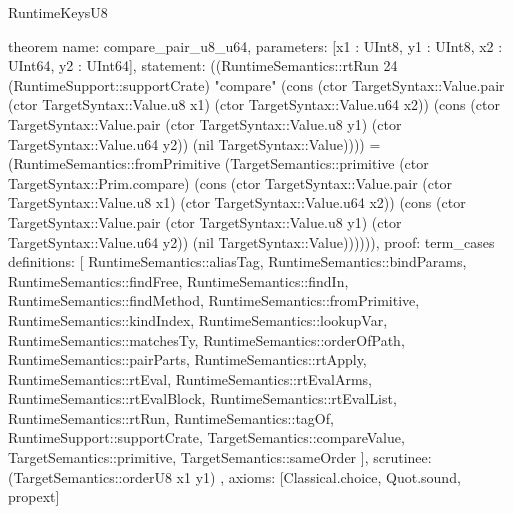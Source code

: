 \begin{lexlean}{RuntimeKeysU8}
\begin{semanticmodule}
theorem{
  name: compare_pair_u8_u64,
  parameters: [x1 : UInt8, y1 : UInt8, x2 : UInt64, y2 : UInt64],
  statement: ((RuntimeSemantics::rtRun 24 (RuntimeSupport::supportCrate) "compare" (cons (ctor TargetSyntax::Value.pair (ctor TargetSyntax::Value.u8 x1) (ctor TargetSyntax::Value.u64 x2)) (cons (ctor TargetSyntax::Value.pair (ctor TargetSyntax::Value.u8 y1) (ctor TargetSyntax::Value.u64 y2)) (nil TargetSyntax::Value)))) = (RuntimeSemantics::fromPrimitive (TargetSemantics::primitive (ctor TargetSyntax::Prim.compare) (cons (ctor TargetSyntax::Value.pair (ctor TargetSyntax::Value.u8 x1) (ctor TargetSyntax::Value.u64 x2)) (cons (ctor TargetSyntax::Value.pair (ctor TargetSyntax::Value.u8 y1) (ctor TargetSyntax::Value.u64 y2)) (nil TargetSyntax::Value)))))),
  proof: term_cases{
    definitions: [
      RuntimeSemantics::aliasTag,
      RuntimeSemantics::bindParams,
      RuntimeSemantics::findFree,
      RuntimeSemantics::findIn,
      RuntimeSemantics::findMethod,
      RuntimeSemantics::fromPrimitive,
      RuntimeSemantics::kindIndex,
      RuntimeSemantics::lookupVar,
      RuntimeSemantics::matchesTy,
      RuntimeSemantics::orderOfPath,
      RuntimeSemantics::pairParts,
      RuntimeSemantics::rtApply,
      RuntimeSemantics::rtEval,
      RuntimeSemantics::rtEvalArms,
      RuntimeSemantics::rtEvalBlock,
      RuntimeSemantics::rtEvalList,
      RuntimeSemantics::rtRun,
      RuntimeSemantics::tagOf,
      RuntimeSupport::supportCrate,
      TargetSemantics::compareValue,
      TargetSemantics::primitive,
      TargetSemantics::sameOrder
    ],
    scrutinee: (TargetSemantics::orderU8 x1 y1)
  },
  axioms: [Classical.choice, Quot.sound, propext]
}


\end{semanticmodule}
\end{lexlean}
